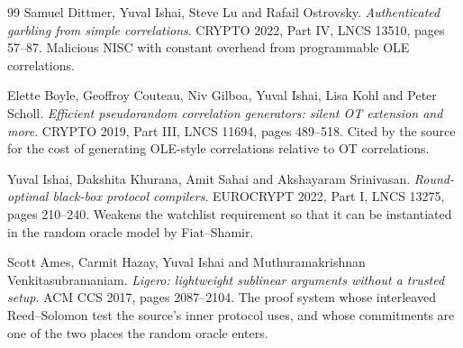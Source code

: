 \documentclass{aicr-conjecture}
\begin{document}
\begin{aicrbibliography}{99}
Samuel Dittmer, Yuval Ishai, Steve Lu and Rafail Ostrovsky.
\emph{Authenticated garbling from simple correlations}.
CRYPTO 2022, Part IV, LNCS 13510, pages 57--87.
Malicious NISC with constant overhead from programmable OLE
correlations.

Elette Boyle, Geoffroy Couteau, Niv Gilboa, Yuval Ishai, Lisa Kohl and
Peter Scholl.
\emph{Efficient pseudorandom correlation generators: silent OT extension
and more}.
CRYPTO 2019, Part III, LNCS 11694, pages 489--518.
Cited by the source for the cost of generating OLE-style correlations
relative to OT correlations.

Yuval Ishai, Dakshita Khurana, Amit Sahai and Akshayaram Srinivasan.
\emph{Round-optimal black-box protocol compilers}.
EUROCRYPT 2022, Part I, LNCS 13275, pages 210--240.
Weakens the watchlist requirement so that it can be instantiated in the
random oracle model by Fiat--Shamir.

Scott Ames, Carmit Hazay, Yuval Ishai and Muthuramakrishnan
Venkitasubramaniam.
\emph{Ligero: lightweight sublinear arguments without a trusted setup}.
ACM CCS 2017, pages 2087--2104.
The proof system whose interleaved Reed--Solomon test the source's inner
protocol uses, and whose commitments are one of the two places the random
oracle enters.

\end{aicrbibliography}
\end{document}
